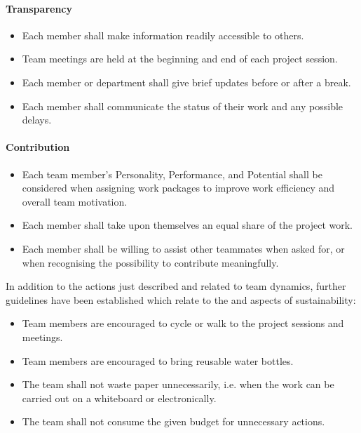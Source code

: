 \paragraph{Transparency}
\begin{itemize}
    \item Each member shall make information readily accessible to others. 

    \item Team meetings are held at the beginning and end of each project session.
    
    \item Each member or department shall give brief updates before or after a break.

    \item Each member shall communicate the status of their work and any possible delays.
\end{itemize}

\paragraph{Contribution}
\begin{itemize}
    \item Each team member's Personality, Performance, and Potential shall be considered when assigning work packages to improve work efficiency and overall team motivation.

    \item Each member shall take upon themselves an equal share of the project work. 
    
    \item Each member shall be willing to assist other teammates when asked for, or when recognising the possibility to contribute meaningfully.
\end{itemize}



In addition to the actions just described and related to team dynamics, further guidelines have been established which relate to the  and  aspects of sustainability:
\begin{itemize}
    \item Team members are encouraged to cycle or walk to the project sessions and meetings.
    \item Team members are encouraged to bring reusable water bottles.
    \item The team shall not waste paper unnecessarily, i.e\@. when the work can be carried out on a whiteboard or electronically.
    \item The team shall not consume the given budget for unnecessary actions.
\end{itemize}


